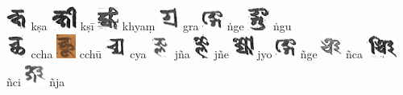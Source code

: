\documentclass[a4paper,12pt]{article}
\begin{document}
{ \includegraphics[height=8.0mm]{kssa.jpg} kṣa  \includegraphics[height=8.0mm]{kṣī.jpg} kṣī \includegraphics[height=8.0mm]{kyam.jpg} khyaṃ \includegraphics[height=8.0mm]{gra.jpg} gra \includegraphics[height=8.0mm]{nge.jpg} ṅge \includegraphics[height=8.0mm]{ngu.jpg} ṅgu\\
\noindent
\includegraphics[height=8.0mm]{ccha.jpg} ccha \includegraphics[height=8.0mm]{cchū.jpg} cchū \includegraphics[height=8.0mm]{cya.jpg} cya \includegraphics[height=8.0mm]{jna.jpg} jña \includegraphics[height=8.0mm]{jne.jpg} jñe \includegraphics[height=8.0mm]{jyo.jpg} jyo \includegraphics[height=8.0mm]{nge.jpg} ñge \includegraphics[height=8.0mm]{nca.jpg} ñca \includegraphics[height=8.0mm]{nci.jpg} ñci \includegraphics[height=8.0mm]{nja.jpg} ñja \\
}
\end{document}
